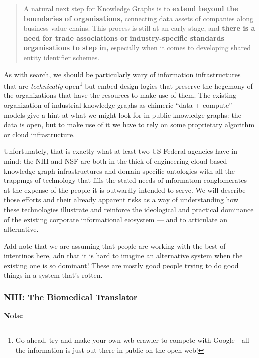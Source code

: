 \begin{quote}
A natural next step for Knowledge Graphs is to \textbf{extend beyond the
boundaries of organisations,} connecting data assets of companies along
business value chains. This process is still at an early stage, and
\textbf{there is a need for trade associations or industry-specific
standards organisations to step in,} especially when it comes to
developing shared entity identifier schemes. \cite{panExploitingLinkedData2017} 
\end{quote}

As with search, we should be particularly wary of information
infrastructures that are \emph{technically} open\footnote{Go ahead, try
  and make your own web crawler to compete with Google - all the
  information is just out there in public on the open web!} but embed
design logics that preserve the hegemony of the organizations that have
the resources to make use of them. The existing organization of
industrial knowledge graphs as chimeric ``data + compute'' models give a
hint at what we might look for in public knowledge graphs: the data is
open, but to make use of it we have to rely on some proprietary
algorithm or cloud infrastructure.

Unfortunately, that is exactly what at least two US Federal agencies
have in mind: the NIH and NSF are both in the thick of engineering
cloud-based knowledge graph infrastructures and domain-specific
ontologies with all the trappings of technology that fills the stated
needs of information conglomerates at the expense of the people it is
outwardly intended to serve. We will describe those efforts and their
already apparent risks as a way of understanding how these technologies
illustrate and reinforce the ideological and practical dominance of the
existing corporate informational ecosystem --- and to articulate an
alternative.

Add note that we are assuming that people are working with the best of
intentinos here, adn that it is hard to imagine an alternative system
when the existing one is so dominant! These are mostly good people
trying to do good things in a system that's rotten.

\hypertarget{nih-the-biomedical-translator}{%
\subsubsection{NIH: The Biomedical
Translator}\label{nih-the-biomedical-translator}}

\textbf{Note:}

